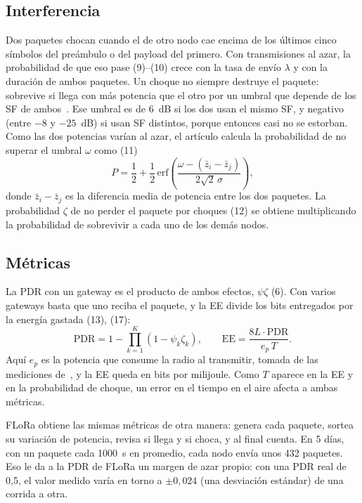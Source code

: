 \documentclass[conference,a4paper]{IEEEtran}
\begin{document}
\subsection{Interferencia}

Dos paquetes chocan cuando el de otro nodo cae encima de los últimos cinco símbolos del preámbulo o del payload del primero. Con transmisiones al azar, la probabilidad de que eso pase (9)--(10) crece con la tasa de envío $\lambda$ y con la duración de ambos paquetes. Un choque no siempre destruye el paquete: sobrevive si llega con más potencia que el otro por un umbral que depende de los SF de ambos~\cite{croce}. Ese umbral es de 6~dB si los dos usan el mismo SF, y negativo (entre $-8$ y $-25$~dB) si usan SF distintos, porque entonces casi no se estorban. Como las dos potencias varían al azar, el artículo calcula la probabilidad de no superar el umbral $\omega$ como (11)
\begin{equation}
  P=\frac12+\frac12\,\mathrm{erf}\!\left(\frac{\omega-(\bar{z}_i-\bar{z}_j)}{2\sqrt2\,\sigma}\right),
  \label{eq:once}
\end{equation}
donde $\bar{z}_i-\bar{z}_j$ es la diferencia media de potencia entre los dos paquetes. La probabilidad $\zeta$ de no perder el paquete por choques (12) se obtiene multiplicando la probabilidad de sobrevivir a cada uno de los demás nodos.

\subsection{Métricas}

La PDR con un gateway es el producto de ambos efectos, $\psi\zeta$ (6). Con varios gateways basta que uno reciba el paquete, y la EE divide los bits entregados por la energía gastada (13), (17):
\begin{equation}
  \mathrm{PDR}=1-\prod_{k=1}^{K}\left(1-\psi_k\zeta_k\right),\qquad
  \mathrm{EE}=\frac{8L\cdot\mathrm{PDR}}{e_p\,T}.
  \label{eq:metricas}
\end{equation}
Aquí $e_p$ es la potencia que consume la radio al transmitir, tomada de las mediciones de~\cite{liando}, y la EE queda en bits por milijoule. Como $T$ aparece en la EE y en la probabilidad de choque, un error en el tiempo en el aire afecta a ambas métricas.

FLoRa obtiene las mismas métricas de otra manera: genera cada paquete, sortea su variación de potencia, revisa si llega y si choca, y al final cuenta. En 5 días, con un paquete cada 1000~s en promedio, cada nodo envía unos 432 paquetes. Eso le da a la PDR de FLoRa un margen de azar propio: con una PDR real de 0,5, el valor medido varía en torno a $\pm0{,}024$ (una desviación estándar) de una corrida a otra.
\end{document}
